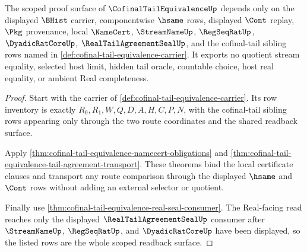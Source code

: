 \begin{theorem}
\label{thm:cofinal-tail-equivalence-scope-readback}
The scoped proof surface of $\CofinalTailEquivalenceUp$ depends only on the displayed $\BHist$ carrier, componentwise $\hsame$ rows, displayed $\Cont$ replay, $\Pkg$ provenance, local $\NameCert$, $\StreamNameUp$, $\RegSeqRatUp$, $\DyadicRatCoreUp$, $\RealTailAgreementSealUp$, and the cofinal-tail sibling rows named in \autoref{def:cofinal-tail-equivalence-carrier}. It exports no quotient stream equality, selected host limit, hidden tail oracle, countable choice, host real equality, or ambient Real completeness.
\end{theorem}
\begin{proof}
Start with the carrier of \autoref{def:cofinal-tail-equivalence-carrier}. Its row inventory is exactly $R_0,R_1,W,Q,D,A,H,C,P,N$, with the cofinal-tail sibling rows appearing only through the two route coordinates and the shared readback surface.

Apply \autoref{thm:cofinal-tail-equivalence-namecert-obligations} and \autoref{thm:cofinal-tail-equivalence-tail-agreement-transport}. These theorems bind the local certificate clauses and transport any route comparison through the displayed $\hsame$ and $\Cont$ rows without adding an external selector or quotient.

Finally use \autoref{thm:cofinal-tail-equivalence-real-seal-consumer}. The Real-facing read reaches only the displayed $\RealTailAgreementSealUp$ consumer after $\StreamNameUp$, $\RegSeqRatUp$, and $\DyadicRatCoreUp$ have been displayed, so the listed rows are the whole scoped readback surface.
\end{proof}

